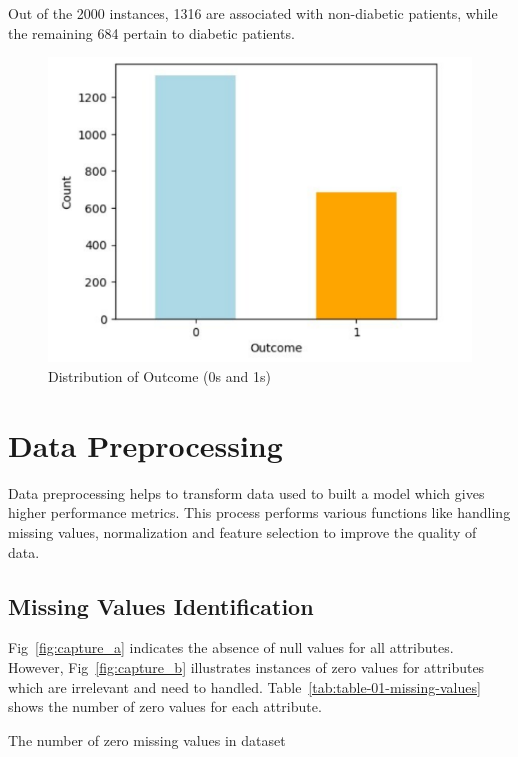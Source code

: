 Out of the 2000 instances, 1316 are associated with non-diabetic patients, while the remaining 684 pertain to diabetic patients.
\begin{figure}[ht]
    \centering    \includegraphics[scale=0.8]{figures/data_distribution.pdf}
    \caption{Distribution of Outcome (0s and 1s)}
    \label{fig:capture_e}
\end{figure}


\section{Data Preprocessing}

Data preprocessing helps to transform data used to built a model which gives higher performance metrics. This process performs various functions like handling missing values, normalization and feature selection to improve the quality of data.

\subsection{Missing Values Identification}
Fig~\ref{fig:capture_a} indicates the absence of null values for all attributes. However, Fig~\ref{fig:capture_b} illustrates instances of zero values for attributes which are irrelevant and need to handled. Table~\ref{tab:table-01-missing-values} shows the number of zero values for each attribute.

 \begin{table}[ht!]
    \centering
    \caption{The number of zero missing values in dataset}
    
    \label{tab:table-01-missing-values}
\end{table}

